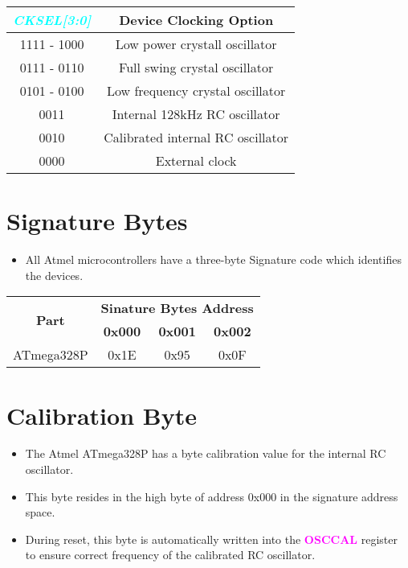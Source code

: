 \documentclass{article}
\newcommand{\bitFormat}[1]{\emph{\textbf{\textcolor{cyan}{#1}}}}
\newcommand{\regFormat}[1]{\textbf{\textcolor{magenta}{#1}}}
\begin{document}
\begin{table}[H]
    \begin{center}
        \begin{tabular}{c|c}
            \textbf{\bitFormat{CKSEL[3:0]}} & \textbf{Device Clocking Option}\\
            \hline
            1111 - 1000 & Low power crystall oscillator\\
            0111 - 0110 & Full swing crystal oscillator\\
            0101 - 0100 & Low frequency crystal oscillator\\
            0011 & Internal 128kHz RC oscillator\\
            0010 & Calibrated internal RC oscillator\\
            0000 & External clock            
        \end{tabular}
    \end{center}
\end{table}

\section{Signature Bytes}
\begin{itemize}
    \item All Atmel microcontrollers have a three-byte Signature code which identifies the devices.
\end{itemize}

\begin{table}[H]
    \begin{center}
        \begin{tabular}{|c|c|c|c|}
            \hline
            \multirow{2}{*}{\textbf{Part}} & \multicolumn{3}{c|}{\textbf{Sinature Bytes Address}}\\
   
            \cline{2-4}  &  \textbf{0x000} & \textbf{0x001} & \textbf{0x002}\\
            \hline
            ATmega328P & 0x1E & 0x95 & 0x0F\\
            \hline
        \end{tabular}
    \end{center}
\end{table}


\section{Calibration Byte}
\begin{itemize}
    \item The Atmel ATmega328P has a byte calibration value for the internal RC oscillator.
    \item This byte resides in the high byte of address 0x000 in the signature address space.
    \item During reset, this byte is automatically written into the \regFormat{OSCCAL} register to ensure correct frequency of the calibrated RC oscillator.
\end{itemize}
\end{document}
